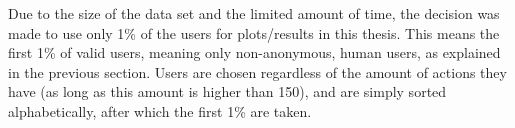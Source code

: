 \begin{table}[htbp]
	\centering
	\caption{The data set structure}\label{tab:data}
\end{table}

Due to the size of the data set and the limited amount of time, the decision was made to use only 1\% of the users for plots/results in this thesis. This means the first 1\% of valid users, meaning only non-anonymous, human users, as explained in the previous section. Users are chosen regardless of the amount of actions they have (as long as this amount is higher than 150), and are simply sorted alphabetically, after which the first 1\% are taken.

